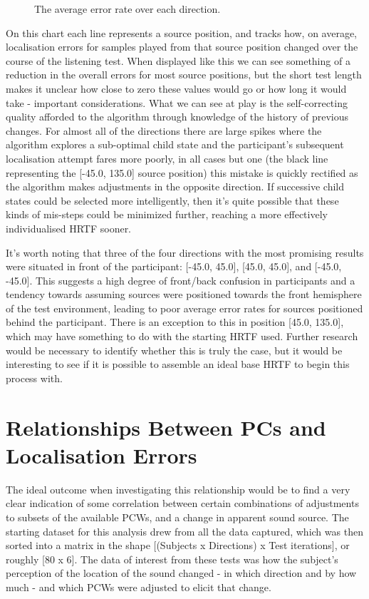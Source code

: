\begin{figure}
	\caption{The average error rate over each direction.}
\end{figure}

On this chart each line represents a source position, and tracks how, on average, localisation errors for samples played from that source position changed over the course of the listening test. When displayed like this we can see something of a reduction in the overall errors for most source positions, but the short test length makes it unclear how close to zero these values would go or how long it would take - important considerations. What we can see at play is the self-correcting quality afforded to the algorithm through knowledge of the history of previous changes. For almost all of the directions there are large spikes where the algorithm explores a sub-optimal child state and the participant's subsequent localisation attempt fares more poorly, in all cases but one (the black line representing the [-45.0, 135.0] source position) this mistake is quickly rectified as the algorithm makes adjustments in the opposite direction. If successive child states could be selected more intelligently, then it's quite possible that these kinds of mis-steps could be minimized further, reaching a more effectively individualised HRTF sooner.

It's worth noting that three of the four directions with the most promising results were situated in front of the participant: [-45.0, 45.0], [45.0, 45.0], and [-45.0, -45.0]. This suggests a high degree of front/back confusion in participants and a tendency towards assuming sources were positioned towards the front hemisphere of the test environment, leading to poor average error rates for sources positioned behind the participant. There is an exception to this in position [45.0, 135.0], which may have something to do with the starting HRTF used. Further research would be necessary to identify whether this is truly the case, but it would be interesting to see if it is possible to assemble an ideal base HRTF to begin this process with.

\section{Relationships Between PCs and Localisation Errors}
The ideal outcome when investigating this relationship would be to find a very clear indication of some correlation between certain combinations of adjustments to subsets of the available PCWs, and a change in apparent sound source. The starting dataset for this analysis drew from all the data captured, which was then sorted into a matrix in the shape [(Subjects x Directions) x Test iterations], or roughly [80 x 6]. The data of interest from these tests was how the subject's perception of the location of the sound changed - in which direction and by how much - and which PCWs were adjusted to elicit that change. 

